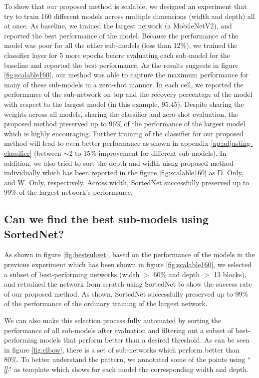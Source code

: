 \documentclass[letterpaper]{article} %
\begin{document}
To show that our proposed method is scalable, we designed an experiment that try to train 160 different models across multiple dimensions (width and depth) all at once. As baseline, we trained the largest network (a MobileNetV2), and reported the best performance of the model. Because the performance of the model was poor for all the other sub-models (less than 12\%), we trained the classifier layer for 5 more epochs before evaluating each sub-model for the baseline and reported the best performance. As the results suggests in figure \ref{fig:scalable160}, our method was able to capture the maximum performance for many of these sub-models in a zero-shot manner. In each cell, we reported the performance of the sub-network on top and the recovery percentage of the model with respect to the largest model (in this example, 95.45). Despite sharing the weights across all models, sharing the classifier and zero-shot evaluation, the proposed method preserved up to 96\% of the performance of the largest model which is highly encouraging. Further training of the classifier for our proposed method will lead to even better performance as shown in appendix \ref{ap:adjusting-classifier} (between $\sim$2 to 15\% improvement for different sub-models). In addition, we also tried to sort the depth and width uisng proposed method individually which has been reported in the figure \ref{fig:scalable160} as D. Only, and W. Only, respectively. Across width, SortedNet successfully preserved up to 99\% of the largest network's performance.


\subsection{Can we find the best sub-models using SortedNet?}

As shown in figure \ref{fig:bestsubset}, based on the performance of the models in the previous experiment which has been shown in figure \ref{fig:scalable160}, we selected a subset of best-performing networks (width $>$ 60\% and depth $>$ 13 blocks), and retrained the network from scratch using SortedNet to show the success rate of our proposed method. As shown, SortedNet successfully preserved up to 99\% of the performance of the ordinary training of the largest network. %

We can also make this selection process fully automated by sorting the performance of all sub-models after evaluation and filtering out a subset of best-performing models that perform better than a desired threshold. As can be seen in figure \ref{fig:elbow}, there is a set of sub-networks which perform better than 80\%. To better understand the pattern, we annotated some of the points using ``$_{W}^{D}$" as template which shows for each model the corresponding width and depth.
\end{document}
